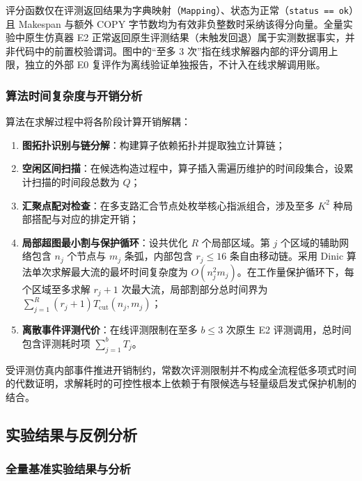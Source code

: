 \documentclass[anonymous,withtoc]{gmcm2026}
\providecommand{\tightlist}{\setlength{\itemsep}{0pt}\setlength{\parskip}{0pt}}
\begin{document}
评分函数仅在评测返回结果为字典映射（\texttt{Mapping}）、状态为正常（\texttt{status\ ==\ \textquotesingle{}ok\textquotesingle{}}）且 Makespan 与额外 COPY 字节数均为有效非负整数时采纳该得分向量。全量实验中原生仿真器 E2 正常返回原生评测结果（未触发回退）属于实测数据事实，并非代码中的前置校验谓词。图中的``至多 3 次''指在线求解器内部的评分调用上限，独立的外部 E0 复评作为离线验证单独报告，不计入在线求解调用账。

\subsubsection{算法时间复杂度与开销分析}

算法在求解过程中将各阶段计算开销解耦：

\begin{enumerate}
\def\labelenumi{\arabic{enumi}.}
\tightlist
\item
  \textbf{图拓扑识别与链分解}：构建算子依赖拓扑并提取独立计算链；
\item
  \textbf{空闲区间扫描}：在候选构造过程中，算子插入需遍历维护的时间段集合，设累计扫描的时间段总数为 \(Q\)；
\item
  \textbf{汇聚点配对检查}：在多支路汇合节点处枚举核心指派组合，涉及至多 \(K^2\) 种局部搭配与对应的排定开销；
\item
  \textbf{局部超图最小割与保护循环}：设共优化 \(R\) 个局部区域。第 \(j\) 个区域的辅助网络包含 \(n_j\) 个节点与 \(m_j\) 条弧，内部包含 \(r_j \le 16\) 条自由移动链。采用 Dinic 算法\cite{ref9}单次求解最大流的最坏时间复杂度为 \(O(n_j^2 m_j)\)。在工作量保护循环下，每个区域至多求解 \(r_j + 1\) 次最大流，局部割部分总时间界为 \(\sum_{j=1}^R (r_j + 1) T_{\mathrm{cut}}(n_j, m_j)\)；
\item
  \textbf{离散事件评测代价}：在线评测限制在至多 \(b \le 3\) 次原生 E2 评测调用，总时间包含评测耗时项 \(\sum_{j=1}^b T_j\)。
\end{enumerate}

受评测仿真内部事件推进开销制约，常数次评测限制并不构成全流程低多项式时间的代数证明，求解耗时的可控性根本上依赖于有限候选与轻量级启发式保护机制的结合。

\subsection{实验结果与反例分析}

\subsubsection{全量基准实验结果与分析}
\end{document}
